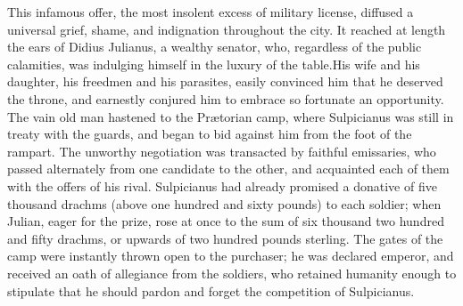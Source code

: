 This infamous offer, the most insolent excess of military
license, diffused a universal grief, shame, and indignation
throughout the city. It reached at length the ears of Didius
Julianus, a wealthy senator, who, regardless of the public
calamities, was indulging himself in the luxury of the table.\footnotemark[11]
His wife and his daughter, his freedmen and his parasites, easily
convinced him that he deserved the throne, and earnestly conjured
him to embrace so fortunate an opportunity. The vain old man
hastened to the Prætorian camp, where Sulpicianus was still in
treaty with the guards, and began to bid against him from the
foot of the rampart. The unworthy negotiation was transacted by
faithful emissaries, who passed alternately from one candidate to
the other, and acquainted each of them with the offers of his
rival. Sulpicianus had already promised a donative of five
thousand drachms (above one hundred and sixty pounds) to each
soldier; when Julian, eager for the prize, rose at once to the
sum of six thousand two hundred and fifty drachms, or upwards of
two hundred pounds sterling. The gates of the camp were instantly
thrown open to the purchaser; he was declared emperor, and
received an oath of allegiance from the soldiers, who retained
humanity enough to stipulate that he should pardon and forget the
competition of Sulpicianus.\footnotemark[111]



